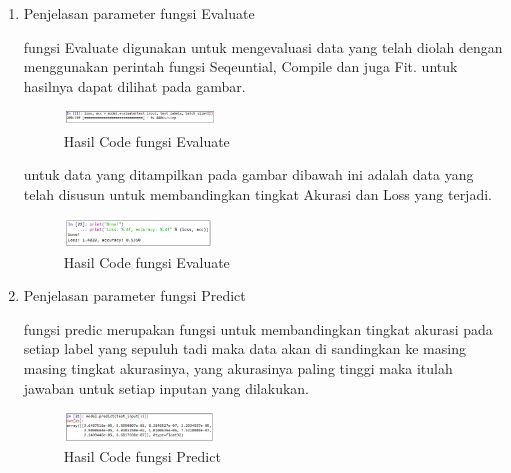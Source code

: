 \begin{enumerate}
            \item Penjelasan parameter fungsi Evaluate
            
            
            
            \subitem fungsi Evaluate digunakan untuk mengevaluasi data yang telah diolah dengan menggunakan perintah fungsi Seqeuntial, Compile dan juga Fit. untuk hasilnya dapat dilihat pada gambar.
            
            \begin{figure}[H]
                \includegraphics[width=4cm]{figures/1174095/tugas6/10.png}
                \centering
                  \caption{Hasil Code fungsi Evaluate}
            \end{figure}
            
            
            
            
            \subitem untuk data yang ditampilkan pada gambar dibawah ini adalah data yang telah disusun untuk membandingkan tingkat Akurasi dan Loss yang terjadi.
            
            \begin{figure}[H]
                \includegraphics[width=4cm]{figures/1174095/tugas6/11.png}
                \centering
                  \caption{Hasil Code fungsi Evaluate}
            \end{figure}
            
            \item Penjelasan parameter fungsi Predict
            
            
            
            \subitem fungsi predic merupakan fungsi untuk membandingkan tingkat akurasi pada setiap label yang sepuluh tadi maka data akan di sandingkan ke masing masing tingkat akurasinya, yang akurasinya paling tinggi maka itulah jawaban untuk setiap inputan yang dilakukan. 
            
            \begin{figure}[H]
                \includegraphics[width=4cm]{figures/1174095/tugas6/12.png}
                \centering
                  \caption{Hasil Code fungsi Predict}
            \end{figure}
            \end{enumerate}